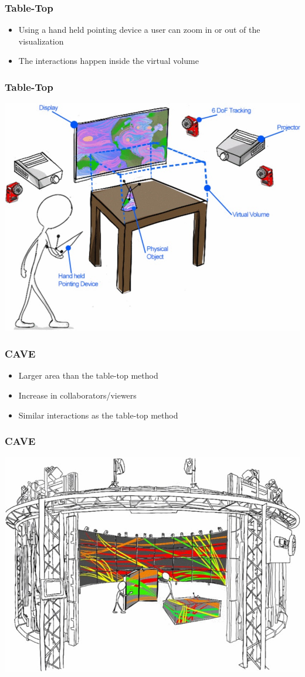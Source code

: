 \documentclass{beamer}
\begin{document}
\begin{frame}
\frametitle{Table-Top} 
	\begin{itemize}
		\item Using a hand held pointing device a user can zoom in or out of the visualization 
		\item The interactions happen inside the virtual volume
	\end{itemize}
\end{frame}

\begin{frame}
\frametitle{Table-Top} 
\includegraphics[width=\textwidth]{../Sample_paper/images/Tabletop}
\end{frame}

\begin{frame}
\frametitle{CAVE}
	\begin{itemize}
		\item Larger area than the table-top method
		\item Increase in collaborators/viewers
		\item Similar interactions as the table-top method
	\end{itemize}
\end{frame}

\begin{frame}
\frametitle{CAVE}
\includegraphics[width=\textwidth]{../Sample_paper/images/CAVE}
\end{frame}
\end{document}

